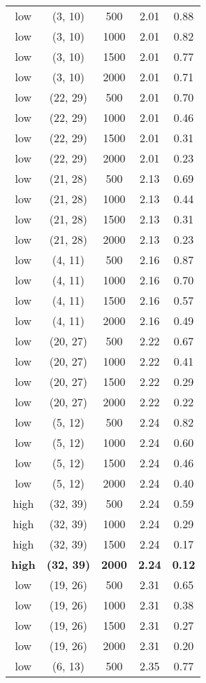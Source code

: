 \begin{tabular}{c c c c c}
low & (3, 10) &  500 & 2.01 & 0.88 \\
low & (3, 10) &  1000 & 2.01 & 0.82 \\
low & (3, 10) &  1500 & 2.01 & 0.77 \\
low & (3, 10) &  2000 & 2.01 & 0.71 \\
low & (22, 29) &  500 & 2.01 & 0.70 \\
low & (22, 29) &  1000 & 2.01 & 0.46 \\
low & (22, 29) &  1500 & 2.01 & 0.31 \\
low & (22, 29) &  2000 & 2.01 & 0.23 \\
low & (21, 28) &  500 & 2.13 & 0.69 \\
low & (21, 28) &  1000 & 2.13 & 0.44 \\
low & (21, 28) &  1500 & 2.13 & 0.31 \\
low & (21, 28) &  2000 & 2.13 & 0.23 \\
low & (4, 11) &  500 & 2.16 & 0.87 \\
low & (4, 11) &  1000 & 2.16 & 0.70 \\
low & (4, 11) &  1500 & 2.16 & 0.57 \\
low & (4, 11) &  2000 & 2.16 & 0.49 \\
low & (20, 27) &  500 & 2.22 & 0.67 \\
low & (20, 27) &  1000 & 2.22 & 0.41 \\
low & (20, 27) &  1500 & 2.22 & 0.29 \\
low & (20, 27) &  2000 & 2.22 & 0.22 \\
low & (5, 12) &  500 & 2.24 & 0.82 \\
low & (5, 12) &  1000 & 2.24 & 0.60 \\
low & (5, 12) &  1500 & 2.24 & 0.46 \\
low & (5, 12) &  2000 & 2.24 & 0.40 \\
high & (32, 39) &  500 & 2.24 & 0.59 \\
high & (32, 39) &  1000 & 2.24 & 0.29 \\
high & (32, 39) &  1500 & 2.24 & 0.17 \\
\textbf{high} & \textbf{(32, 39)} & \textbf{ 2000} & \textbf{2.24} & \textbf{0.12} \\
low & (19, 26) &  500 & 2.31 & 0.65 \\
low & (19, 26) &  1000 & 2.31 & 0.38 \\
low & (19, 26) &  1500 & 2.31 & 0.27 \\
low & (19, 26) &  2000 & 2.31 & 0.20 \\
low & (6, 13) &  500 & 2.35 & 0.77 \\

\end{tabular}
